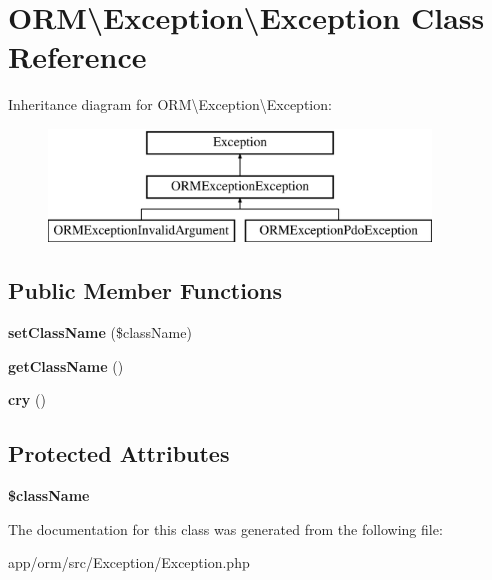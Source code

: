 \hypertarget{classORM_1_1Exception_1_1Exception}{}\section{O\+RM\textbackslash{}Exception\textbackslash{}Exception Class Reference}
\label{classORM_1_1Exception_1_1Exception}
Inheritance diagram for O\+RM\textbackslash{}Exception\textbackslash{}Exception\+:\begin{figure}[H]
\begin{center}
\leavevmode
\includegraphics[height=3.000000cm]{classORM_1_1Exception_1_1Exception}
\end{center}
\end{figure}
\subsection*{Public Member Functions}
\begin{DoxyCompactItemize}
\item 
{\bfseries set\+Class\+Name} (\$class\+Name)\hypertarget{classORM_1_1Exception_1_1Exception_a7608581ef97e9ee04fda4001da20206c}{}\label{classORM_1_1Exception_1_1Exception_a7608581ef97e9ee04fda4001da20206c}

\item 
{\bfseries get\+Class\+Name} ()\hypertarget{classORM_1_1Exception_1_1Exception_abffb277c4c2ea6271d26da855263b125}{}\label{classORM_1_1Exception_1_1Exception_abffb277c4c2ea6271d26da855263b125}

\item 
{\bfseries cry} ()\hypertarget{classORM_1_1Exception_1_1Exception_ae620eebdf0ac85cb86421262eb9bab3a}{}\label{classORM_1_1Exception_1_1Exception_ae620eebdf0ac85cb86421262eb9bab3a}

\end{DoxyCompactItemize}
\subsection*{Protected Attributes}
\begin{DoxyCompactItemize}
\item 
{\bfseries \$class\+Name}\hypertarget{classORM_1_1Exception_1_1Exception_a4c9b1310c6b111a2b9add55bffced260}{}\label{classORM_1_1Exception_1_1Exception_a4c9b1310c6b111a2b9add55bffced260}

\end{DoxyCompactItemize}


The documentation for this class was generated from the following file\+:\begin{DoxyCompactItemize}
\item 
app/orm/src/\+Exception/Exception.\+php\end{DoxyCompactItemize}
